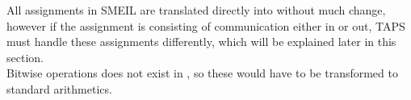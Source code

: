 All assignments in SMEIL are translated directly into \cspm{} without much change, however if the assignment is consisting of communication either in or out, TAPS must handle these assignments differently, which will be explained later in this section.\\




Bitwise operations does not exist in \cspm{}, so these would have to be transformed to standard arithmetics. %



